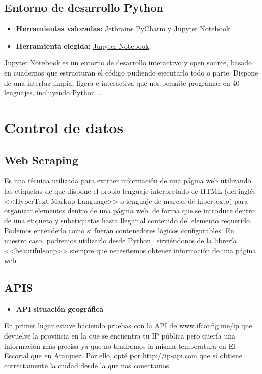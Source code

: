 \subsection{Entorno de desarrollo Python}
\begin{itemize}
    \item \textbf{Herramientas valoradas:} \href{https://www.jetbrains.com/es-es/pycharm/}{Jetbrains PyCharm} y \href{https://jupyter.org/}{Jupyter Notebook}.
    \item \textbf{Herramienta elegida:} \href{https://jupyter.org/}{Jupyter Notebook}.
\end{itemize}

Jupyter Notebook es un entorno de desarrollo interactivo y open source, basado en cuadernos que estructuran el código pudiendo ejecutarlo todo o parte. Dispone de una interfaz limpia, ligera e interactiva que nos permite programar en 40 lenguajes, incluyendo Python~\cite{misc:Python}.

\section{Control de datos}
\subsection{Web Scraping}
Es una técnica utilizada para extraer información de una página web utilizando las etiquetas de que dispone el propio lenguaje interpretado de HTML (del inglés <<HyperText Markup Language>> o lenguaje de marcas de hipertexto) para organizar elementos dentro de una página web, de forma que se introduce dentro de una etiqueta y subetiquetas hasta llegar al contenido del elemento requerido. Podemos entenderlo como si fueran contenedores lógicos configurables.
En nuestro caso, podremos utilizarlo desde Python~\cite{misc:Python} sirviéndonos de la librería <<beautifulsoup>> siempre que necesitemos obtener información de una página web.

\subsection{APIS}
\begin{itemize}
    \item \textbf{API situación geográfica}
\end{itemize}
En primer lugar estuve haciendo pruebas con la API de \url{www.ifconfig.me/ip} que devuelve la provincia en la que se encuentra tu IP pública pero quería una información más precisa ya que no tendremos la misma temperatura en El Escorial que en Aranjuez. Por ello, opté por \url{http://ip-api.com} que sí obtiene correctamente la ciudad desde la que nos conectamos.

